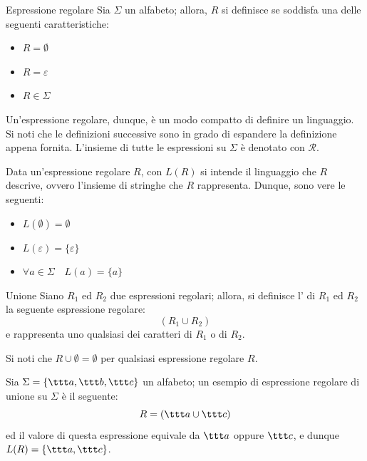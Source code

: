 \documentclass[a4paper, 12pt]{report}
\begin{document}
    \begin{frameddefn}{Espressione regolare}
        Sia $\Sigma$ un alfabeto; allora, $R$ si definisce  se soddisfa una delle seguenti caratteristiche:

        \begin{itemize}
            \item $R = \emptyset$
            \item $R = \varepsilon$
            \item $R \in \Sigma$
        \end{itemize}

        Un'espressione regolare, dunque, è un modo compatto di definire un linguaggio. Si noti che le definizioni successive sono in grado di espandere la definizione appena fornita. L'insieme di tutte le espressioni su $\Sigma$ è denotato con $\mathcal{R}$.

        Data un'espressione regolare $R$, con $L(R)$ si intende il linguaggio che $R$ descrive, ovvero l'insieme di stringhe che $R$ rappresenta. Dunque, sono vere le seguenti:

        \begin{itemize}
            \item $L(\emptyset) = \emptyset$
            \item $L(\varepsilon) = \{ \varepsilon \}$
            \item $\forall a \in \Sigma \quad L(a) = \{ a\}$
        \end{itemize}
    \end{frameddefn}

    \begin{frameddefn}{Unione}
        Siano $R_1$ ed $R_2$ due espressioni regolari; allora, si definisce l' di $R_1$ ed $R_2$ la seguente espressione regolare: $$(R_1 \cup R_2)$$ e rappresenta uno qualsiasi dei caratteri di $R_1$ o di $R_2$.

        Si noti che $R \cup \emptyset = \emptyset$ per qualsiasi espressione regolare $R$.
    \end{frameddefn}

    \begin{example}[Unione]
        Sia $\Sigma = \{\ttt a, \ttt b, \ttt c\}$ un alfabeto; un esempio di espressione regolare di unione su $\Sigma$ è il seguente: $$R = (\ttt a \cup \ttt c)$$ ed il valore di questa espressione equivale da $\ttt a$ oppure $\ttt c$, e dunque $L(R) = \{ \ttt a, \ttt c\}$.
    \end{example}
\end{document}
